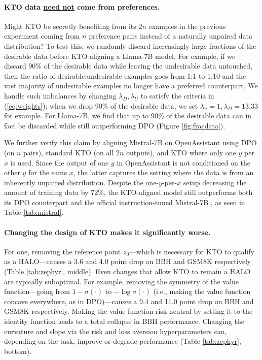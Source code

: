 \paragraph{KTO data \underline{need not} come from preferences.}
Might KTO be secretly benefiting from its $2n$ examples in the previous experiment coming from $n$ preference pairs instead of a naturally unpaired data distribution?
To test this, we randomly discard increasingly large fractions of the desirable data before KTO-aligning a Llama-7B model.
For example, if we discard 90\% of the desirable data while leaving the undesirable data untouched, then the ratio of desirable:undesirable examples goes from 1:1 to 1:10 and the vast majority of undesirable examples no longer have a preferred counterpart.
We handle such imbalances by changing $\lambda_D, \lambda_U$ to satisfy the criteria in (\ref{eq:weights}); when we drop 90\% of the desirable data, we set $\lambda_u = 1, \lambda_D = 13.33$ for example.
For Llama-7B, we find that up to 90\% of the desirable data can in fact be discarded while still outperforming DPO (Figure \ref{fig:fracdata}).

We further verify this claim by aligning Mistral-7B on OpenAssistant using DPO (on $n$ pairs), standard KTO (on all $2n$ outputs), and KTO where only one $y$ per $x$ is used.
Since the output of one $y$ in OpenAssistant is not conditioned on the other $y$ for the same $x$, the latter captures the setting where the data is from an inherently unpaired distribution.
Despite the one-$y$-per-$x$ setup decreasing the amount of training data by 72\%, the KTO-aligned model still outperforms both its DPO counterpart and the official instruction-tuned Mistral-7B \citep{jiang2023mistral}, as seen in Table \ref{tab:mistral}.

\paragraph{Changing the design of KTO makes it significantly worse.}
For one, removing the reference point $z_0$---which is necessary for KTO to qualify as a HALO---causes a 3.6 and 4.0 point drop on BBH and GSM8K respectively (Table \ref{tab:zephyr}, middle).
Even changes that allow KTO to remain a HALO are typically suboptimal.
For example, removing the symmetry of the value function---going from $1 - \sigma(\cdot)$ to $- \log \sigma(\cdot)$ (i.e., making the value function concave everywhere, as in DPO)---causes a 9.4 and 11.0 point drop on BBH and GSM8K respectively.
Making the value function risk-neutral by setting it to the identity function leads to a total collapse in BBH performance.
Changing the curvature and slope via the risk and loss aversion hyperparameters can, depending on the task, improve or degrade performance (Table \ref{tab:zephyr}, bottom).

